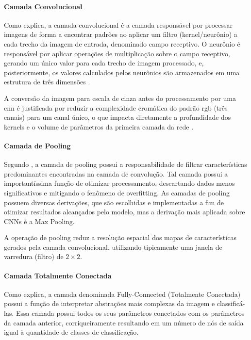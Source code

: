 \paragraph{Camada Convolucional}
Como  explica, 
a camada convolucional é a camada responsável por processar imagens de forma 
a encontrar padrões ao aplicar um filtro (kernel/neurônio) a cada trecho 
da imagem de entrada, denominado campo receptivo. 
O neurônio é responsável por aplicar operações de multiplicação sobre o campo receptivo, 
gerando um único valor para cada trecho de imagem processado, 
e, posteriormente, os valores calculados pelos neurônios são 
armazenados em uma estrutura de três dimensões \cite{ayeni2022convolutional}.

A conversão da imagem para escala de cinza antes 
do processamento por uma \gls{cnn} é justificada 
por reduzir a complexidade cromática do padrão 
\gls{rgb} (três canais) para um canal único, 
o que impacta diretamente a profundidade dos kernels e o volume 
de parâmetros da primeira camada da rede 
\cite{ayeni2022convolutional}.

\paragraph{Camada de Pooling}
Segundo , 
a camada de pooling possui a responsabilidade de filtrar características predominantes 
encontradas na camada de convolução. 
Tal camada possui a importantíssima função de otimizar processamento, 
descartando dados menos significativos 
e mitigando o fenômeno de overfitting.
As camadas de pooling possuem diversas derivações, que são 
escolhidas e implementadas a fim de otimizar resultados alcançados pelo modelo, 
mas a derivação mais aplicada sobre CNNs é a Max Pooling.

A operação de pooling reduz a resolução 
espacial dos mapas de características 
gerados pela camada convolucional, 
utilizando tipicamente uma janela de 
varredura (filtro) de $2 \times 2$.

\paragraph{Camada Totalmente Conectada}
Como  explica, 
a camada denominada Fully-Connected (Totalmente Conectada) possui a função de interpretar 
abstrações mais complexas da imagem e classificá-las. 
Essa camada possui todos os seus parâmetros conectados 
com os parâmetros da camada anterior, 
corriqueiramente resultando em um número de nós de saída 
igual à quantidade de classes de classificação.
